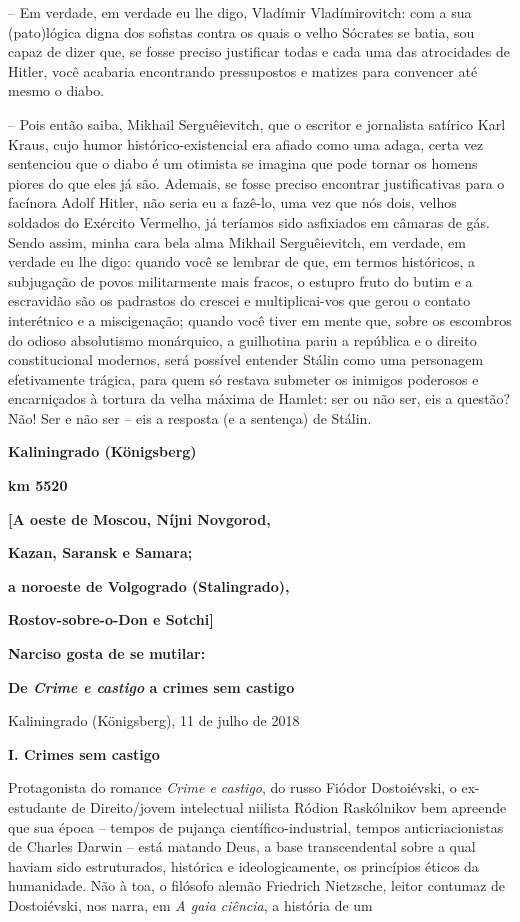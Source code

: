 -- Em verdade, em verdade eu lhe digo, Vladímir Vladímirovitch: com a
sua (pato)lógica digna dos sofistas contra os quais o velho Sócrates se
batia, sou capaz de dizer que, se fosse preciso justificar todas e cada
uma das atrocidades de Hitler, você acabaria encontrando pressupostos e
matizes para convencer até mesmo o diabo.

-- Pois então saiba, Mikhail Serguêievitch, que o escritor e jornalista
satírico Karl Kraus, cujo humor histórico-existencial era afiado como
uma adaga, certa vez sentenciou que o diabo é um otimista se imagina que
pode tornar os homens piores do que eles já são. Ademais, se fosse
preciso encontrar justificativas para o facínora Adolf Hitler, não seria
eu a fazê-lo, uma vez que nós dois, velhos soldados do Exército
Vermelho, já teríamos sido asfixiados em câmaras de gás. Sendo assim,
minha cara bela alma Mikhail Serguêievitch, em verdade, em verdade eu
lhe digo: quando você se lembrar de que, em termos históricos, a
subjugação de povos militarmente mais fracos, o estupro fruto do butim e
a escravidão são os padrastos do crescei e multiplicai-vos que gerou o
contato interétnico e a miscigenação; quando você tiver em mente que,
sobre os escombros do odioso absolutismo monárquico, a guilhotina pariu
a república e o direito constitucional modernos, será possível entender
Stálin como uma personagem efetivamente trágica, para quem só restava
submeter os inimigos poderosos e encarniçados à tortura da velha máxima
de Hamlet: ser ou não ser, eis a questão? Não! Ser e não ser -- eis a
resposta (e a sentença) de Stálin.

\textbf{Kaliningrado (Königsberg)}

\textbf{km 5520}

\textbf{{[}A oeste de Moscou, Níjni Novgorod, }

\textbf{Kazan, Saransk e Samara;}

\textbf{a noroeste de Volgogrado (Stalingrado), }

\textbf{Rostov-sobre-o-Don e Sotchi{]}}

\textbf{Narciso gosta de se mutilar:}

\textbf{De \emph{Crime e castigo} a crimes sem castigo}

Kaliningrado (Königsberg), 11 de julho de 2018

\textbf{I. Crimes sem castigo}

Protagonista do romance \emph{Crime e castigo}, do russo Fiódor
Dostoiévski, o ex-estudante de Direito/jovem intelectual niilista Ródion
Raskólnikov bem apreende que sua época -- tempos de pujança
científico-industrial, tempos anticriacionistas de Charles Darwin --
está matando Deus, a base transcendental sobre a qual haviam sido
estruturados, histórica e ideologicamente, os princípios éticos da
humanidade. Não à toa, o filósofo alemão Friedrich Nietzsche, leitor
contumaz de Dostoiévski, nos narra, em \emph{A gaia ciência}, a história
de um

